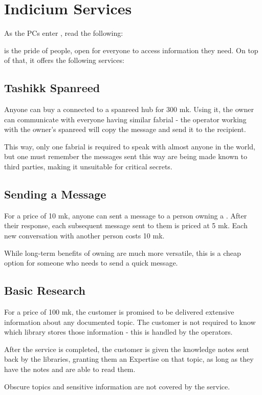 \section{Indicium Services}
\label{sec:indiciumServices}

As the PCs enter \locationIndicium{}, read the following:


\locationIndicium{} is the pride of \locationYeddaw{} people, open for everyone to access information they need. On top of that, it offers the following services:

\subsection{Tashikk Spanreed}

Anyone can buy a \lootSpanreedTashikk{} connected to a spanreed hub for 300 mk. Using it, the owner can communicate with everyone having similar fabrial - the operator working with the owner's spanreed will copy the message and send it to the recipient. 

This way, only one fabrial is required to speak with almost anyone in the world, but one must remember the messages sent this way are being made known to third parties, making it unsuitable for critical secrets.

\subsection{Sending a Message}

For a price of 10 mk, anyone can sent a message to a person owning a \lootSpanreedTashikk{}. After their response, each subsequent message sent to them is priced at 5 mk. Each new conversation with another person costs 10 mk.

While long-term benefits of owning \lootSpanreedTashikk{} are much more versatile, this is a cheap option for someone who needs to send a quick message.

\subsection{Basic Research}

For a price of 100 mk, the customer is promised to be delivered extensive information about any documented topic. The customer is not required to know which library stores those information - this is handled by the operators. 

After the service is completed, the customer is given the knowledge notes sent back by the libraries, granting them an Expertise on that topic, as long as they have the notes and are able to read them.

Obscure topics and sensitive information are not covered by the service.  